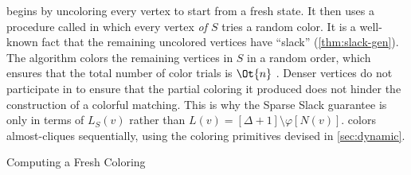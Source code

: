 \documentclass[a4paper,english,11pt]{amsart}
\theoremstyle{definition}
\DeclarePairedDelimiter{\floor}{\lfloor}{\rfloor}
\DeclarePairedDelimiter{\set}{\{}{\}}
\newcommand{\col}{\varphi}
\newcommand{\LS}{L_{S}}
\begin{document}
\PropFreshColoring*

\FreshColoring begins by uncoloring every vertex to start from a fresh state. It then uses a procedure called \OneShotColoring in which every vertex \emph{of $S$} tries a random color. It is a well-known fact that the remaining uncolored vertices have ``slack'' (\cref{thm:slack-gen}). The algorithm colors the remaining vertices in $S$ in a random order, which ensures that the total number of color trials is $\Ot{n}$ \cite{BRW24}.
Denser vertices do not participate in \OneShotColoring to ensure that the partial coloring it produced does not hinder the construction of a colorful matching. This is why the Sparse Slack guarantee is only in terms of $\LS(v)$ rather than $L(v) = [\Delta+1] \setminus \col[N(v)]$.
\FreshColoring colors almost-cliques sequentially, using the coloring primitives devised in \cref{sec:dynamic}.
\begin{algorithm}
\caption{Computing a Fresh Coloring\label{alg:fresh}}
\BlankLine\BlankLine

\BlankLine\BlankLine

\end{algorithm}
\end{document}
